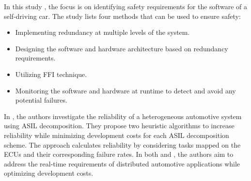 In this study \cite{chitnis2017enabling}, the focus is on identifying safety requirements for the software of a self-driving car. The study lists four methods that can be used to ensure safety:
\begin{itemize}
    \item Implementing redundancy at multiple levels of the system.
    \item Designing the software and hardware architecture based on redundancy requirements.
    \item Utilizing FFI technique.
    \item Monitoring the software and hardware at runtime to detect and avoid any potential failures.

\end{itemize}

 In \cite{xie2017minimizing}, the authors investigate the reliability of a heterogeneous automotive system using ASIL decomposition. They propose two heuristic algorithms to increase reliability while minimizing development costs for each ASIL decomposition scheme. The approach calculates reliability by considering tasks mapped on the ECUs and their corresponding failure rates.
In both \cite{gan2014tradeoff} and \cite{tamacs2011optimization}, the authors aim to address the real-time requirements of distributed automotive applications while optimizing development costs.
